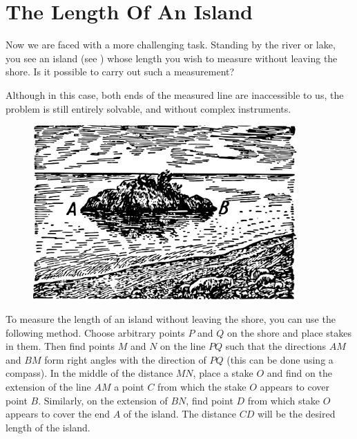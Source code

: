 \section{The Length Of An Island}
\label{sec-2.3}

\ques Now we are faced with a more challenging task. Standing by the river or lake, you see an island (see ) whose length you wish to measure without leaving the shore. Is it possible to carry out such a measurement?

Although in this case, both ends of the measured line are inaccessible to us, the problem is still entirely solvable, and without complex instruments.

\begin{figure}[h!]
\centering
\includegraphics[width=0.9\textwidth]{figures/ch-02/fig-034.pdf}
\end{figure}


\ans To measure the length of an island without leaving the shore, you can use the following method. Choose arbitrary points $P$ and $Q$ on the shore and place stakes in them. Then find points $M$ and $N$ on the line $PQ$ such that the directions $AM$ and $BM$ form right angles with the direction of $PQ$ (this can be done using a compass). In the middle of the distance $MN$, place a stake $O$ and find on the extension of the line $AM$ a point $C$ from which the stake $O$ appears to cover point $B$. Similarly, on the extension of $BN$, find point $D$ from which stake $O$ appears to cover the end $A$ of the island. The distance $CD$ will be the desired length of the island.

